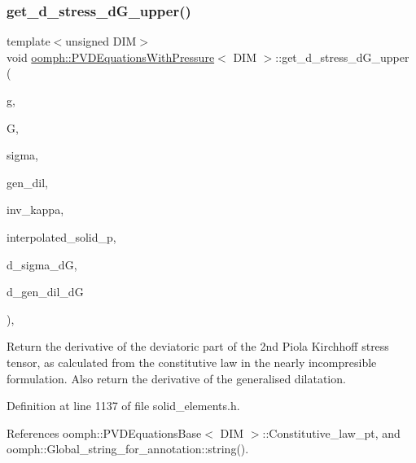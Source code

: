 \subsubsection{\texorpdfstring{get\+\_\+d\+\_\+stress\+\_\+d\+G\+\_\+upper()}{get\_d\_stress\_dG\_upper()}\hspace{0.1cm}{\footnotesize\ttfamily [1/2]}}
{\footnotesize\ttfamily template$<$unsigned D\+IM$>$ \\
void \hyperlink{classoomph_1_1PVDEquationsWithPressure}{oomph\+::\+P\+V\+D\+Equations\+With\+Pressure}$<$ D\+IM $>$\+::get\+\_\+d\+\_\+stress\+\_\+d\+G\+\_\+upper (\begin{DoxyParamCaption}\item[{const \hyperlink{classoomph_1_1DenseMatrix}{Dense\+Matrix}$<$ double $>$ \&}]{g,  }\item[{const \hyperlink{classoomph_1_1DenseMatrix}{Dense\+Matrix}$<$ double $>$ \&}]{G,  }\item[{const \hyperlink{classoomph_1_1DenseMatrix}{Dense\+Matrix}$<$ double $>$ \&}]{sigma,  }\item[{const double \&}]{gen\+\_\+dil,  }\item[{const double \&}]{inv\+\_\+kappa,  }\item[{const double \&}]{interpolated\+\_\+solid\+\_\+p,  }\item[{\hyperlink{classoomph_1_1RankFourTensor}{Rank\+Four\+Tensor}$<$ double $>$ \&}]{d\+\_\+sigma\+\_\+dG,  }\item[{\hyperlink{classoomph_1_1DenseMatrix}{Dense\+Matrix}$<$ double $>$ \&}]{d\+\_\+gen\+\_\+dil\+\_\+dG }\end{DoxyParamCaption})\hspace{0.3cm}{\ttfamily [inline]}, {\ttfamily [protected]}}



Return the derivative of the deviatoric part of the 2nd Piola Kirchhoff stress tensor, as calculated from the constitutive law in the nearly incompresible formulation. Also return the derivative of the generalised dilatation. 



Definition at line 1137 of file solid\+\_\+elements.\+h.



References oomph\+::\+P\+V\+D\+Equations\+Base$<$ D\+I\+M $>$\+::\+Constitutive\+\_\+law\+\_\+pt, and oomph\+::\+Global\+\_\+string\+\_\+for\+\_\+annotation\+::string().

\mbox{\label{classoomph_1_1PVDEquationsWithPressure_a5b2bc099a877ef18bf641480fdf67262}} 
